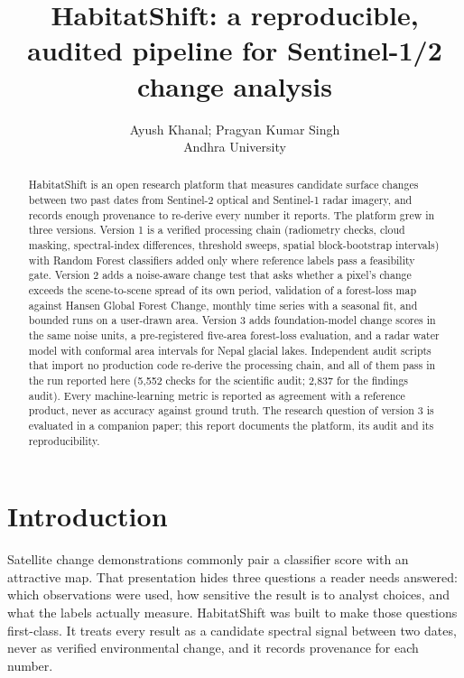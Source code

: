 \documentclass[11pt]{article}
\title{HabitatShift: a reproducible, audited pipeline for Sentinel-1/2 change analysis}
\author{Ayush Khanal; Pragyan Kumar Singh\\ \small Andhra University}
\date{}
\begin{document}
\maketitle
\begin{abstract}

HabitatShift is an open research platform that measures candidate surface changes between two past dates from Sentinel-2 optical and Sentinel-1 radar imagery, and records enough provenance to re-derive every number it reports. The platform grew in three versions. Version 1 is a verified processing chain (radiometry checks, cloud masking, spectral-index differences, threshold sweeps, spatial block-bootstrap intervals) with Random Forest classifiers added only where reference labels pass a feasibility gate. Version 2 adds a noise-aware change test that asks whether a pixel's change exceeds the scene-to-scene spread of its own period, validation of a forest-loss map against Hansen Global Forest Change, monthly time series with a seasonal fit, and bounded runs on a user-drawn area. Version 3 adds foundation-model change scores in the same noise units, a pre-registered five-area forest-loss evaluation, and a radar water model with conformal area intervals for Nepal glacial lakes. Independent audit scripts that import no production code re-derive the processing chain, and all of them pass in the run reported here (5,552 checks for the scientific audit; 2,837 for the findings audit). Every machine-learning metric is reported as agreement with a reference product, never as accuracy against ground truth. The research question of version 3 is evaluated in a companion paper; this report documents the platform, its audit and its reproducibility.

\end{abstract}

\section{Introduction}

Satellite change demonstrations commonly pair a classifier score with an attractive map. That presentation hides three questions a reader needs answered: which observations were used, how sensitive the result is to analyst choices, and what the labels actually measure. HabitatShift was built to make those questions first-class. It treats every result as a candidate spectral signal between two dates, never as verified environmental change, and it records provenance for each number.
\end{document}
